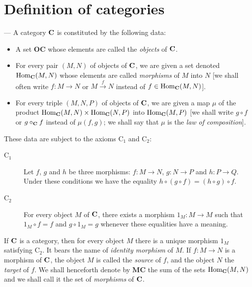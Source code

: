 
\section{Definition of categories}
--- A category $\mathbf{C}$ is constituted by the following data:

\begin{itemize}
\item A set $\mathbf{OC}$ whose elements are called the \emph{objects} of
      $\mathbf{C}$.
\item For every pair $(M,N)$ of objects of $\mathbf{C}$, we are given a set denoted
      $\operatorname{Hom}_{\mathbf{C}}(M,N)$ whose elements are called
      \emph{morphisms} of $M$ into $N$ [we shall often write $f\colon M\to N$
      or $M\xrightarrow{f}N$ instead of $f\in
      \operatorname{Hom}_{\mathbf{C}}(M,N)$].
\item For every triple $(M,N,P)$ of objects of $\mathbf{C}$, we are given a map
      $\mu$ of the product
      $\operatorname{Hom}_{\mathbf{C}}(M,N)\times\operatorname{Hom}_{\mathbf{C}}(N,P)$
      into $\operatorname{Hom}_{\mathbf{C}}(M,P)$ [we shall write $g\circ f$ or
      $g\circ_{\mathbf{C}}f$ instead of $\mu(f,g)$; we shall say that $\mu$ is the
      \emph{law of composition}].
\end{itemize}

These data are subject to the axioms $\mathrm{C}_1$ and $\mathrm{C}_2$:

\begin{description}
\item[$\mathrm{C}_1$] Let $f$, $g$ and $h$ be three morphisms:
$f\colon M\to N$, $g\colon N\to P$ and $h\colon P\to Q$. Under these
conditions we have the equality $h\circ(g\circ f) = (h\circ g)\circ f$.

\item[$\mathrm{C}_2$] For every object $M$ of $\mathbf{C}$, there exists a morphism
$1_M\colon M\to M$ such that $1_M\circ f = f$ and $g\circ 1_M = g$ whenever
these equalities have a meaning.
\end{description}

If $\mathbf{C}$ is a category, then for every object $M$ there is a unique morphism
$1_M$ satisfying $\mathrm{C}_2$. It bears the name of \emph{identity
morphism} of $M$. If $f\colon M\to N$ is a morphism of $\mathbf{C}$, the object $M$
is called the \emph{source} of $f$, and the object $N$ the \emph{target} of
$f$. We shall henceforth denote by $\mathbf{MC}$ the sum of the sets
$\operatorname{Hom}_{\mathbf{C}}(M,N)$ and we shall call it the set of
\emph{morphisms} of $\mathbf{C}$.


